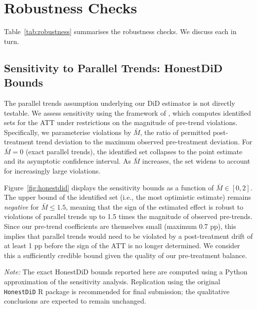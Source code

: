 
\section{Robustness Checks}
\label{sec:robustness}

Table~\ref{tab:robustness} summarises the robustness checks. We discuss each in turn.

\bigskip

\bigskip

\subsection{Sensitivity to Parallel Trends: HonestDiD Bounds}

The parallel trends assumption underlying our DiD estimator is not directly testable. We assess sensitivity using the framework of \citet{Rambachan2023}, which computes identified sets for the ATT under restrictions on the magnitude of pre-trend violations. Specifically, we parameterise violations by $\bar{M}$, the ratio of permitted post-treatment trend deviation to the maximum observed pre-treatment deviation. For $\bar{M} = 0$ (exact parallel trends), the identified set collapses to the point estimate and its asymptotic confidence interval. As $\bar{M}$ increases, the set widens to account for increasingly large violations.

Figure~\ref{fig:honestdid} displays the sensitivity bounds as a function of $\bar{M} \in [0, 2]$. The upper bound of the identified set (i.e., the most optimistic estimate) remains \textit{negative} for $\bar{M} \leq 1.5$, meaning that the sign of the estimated effect is robust to violations of parallel trends up to 1.5 times the magnitude of observed pre-trends. Since our pre-trend coefficients are themselves small (maximum 0.7 pp), this implies that parallel trends would need to be violated by a post-treatment drift of at least 1 pp before the sign of the ATT is no longer determined. We consider this a sufficiently credible bound given the quality of our pre-treatment balance.

\textit{Note:} The exact HonestDiD bounds reported here are computed using a Python approximation of the \citet{Rambachan2023} sensitivity analysis. Replication using the original \texttt{HonestDiD} R package \citep{Rambachan2023R} is recommended for final submission; the qualitative conclusions are expected to remain unchanged.

